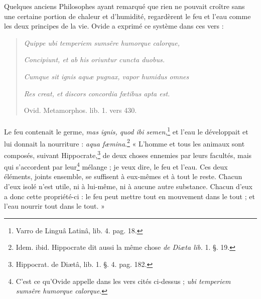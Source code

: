 \documentclass[a4paper, 11pt, oneside, polutonikogreek, french]{article}
\begin{document}
Quelques anciens Philosophes ayant remarqué que rien ne pouvait croître sans une certaine portion de chaleur et d'humidité, regardèrent le feu et l'eau comme les deux principes de la vie. Ovide a exprimé ce système dans ces vers :
\begin{quotation}
\emph{Quippe ubi temperiem sumsêre humorque calorque,}

\emph{Concipiunt, et ab his oriuntur cuncta duobus.}

\emph{Cumque sit ignis aquæ pugnax, vapor humidus omnes}

\emph{Res creat, et discors concordia fœtibus apta est.}

\hspace*{30mm}Ovid. Metamorphos. lib. 1. vers 430.
\end{quotation}
\paragraph{}
Le feu contenait le germe, \emph{mas ignis, quod ibi semen},\footnote{Varro de Linguâ Latinâ, lib. 4. pag. 18.} et l'eau le développait et lui donnait la nourriture : \emph{aqua fæmina}.\footnote{Idem. ibid. Hippocrate dit aussi la même chose \emph{de Diæta lib.} 1. §. 19.} « L'homme et tous les animaux sont composés, suivant Hippocrate,\footnote{Hippocrat. de Diætâ, lib. 1. §. 4. pag. 182.} de deux choses ennemies par leurs facultés, mais qui s'accordent par leur\footnote{C'est ce qu'Ovide appelle dans les vers cités ci-dessus ; \emph{ubi temperiem sumsêre humorque calorque}.} mélange ; je veux dire, le feu et l'eau. Ces deux éléments, joints ensemble, se suffisent à eux-mêmes et à tout le reste. Chacun d'eux isolé n'est utile, ni à lui-même, ni à aucune autre substance. Chacun d'eux a donc cette propriété-ci : le feu peut mettre tout en mouvement dans le tout ; et l'eau nourrir tout dans le tout. »
\end{document}
